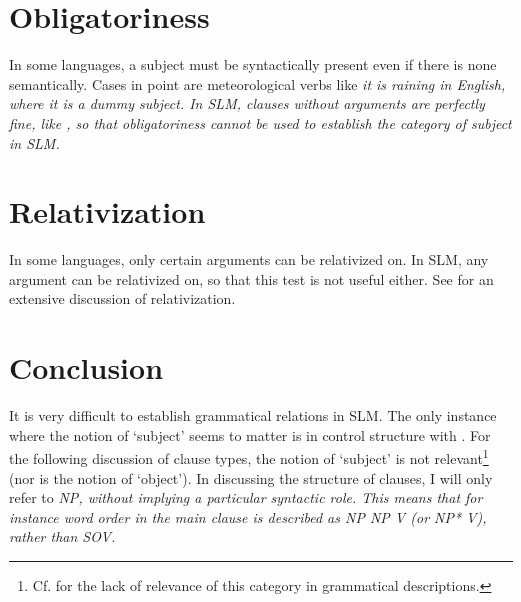 \section{Obligatoriness}\label{sec:grel:Obligatoriness}
In some languages, a subject must be syntactically present even if there is none semantically. Cases in point are meteorological verbs like \em it is raining \em in English, where \em it \em is a dummy subject. In SLM, clauses without arguments are perfectly fine, like , so that obligatoriness cannot be used to establish the category of subject in SLM.

\section{Relativization}\label{sec:grel:Relativization}
In some languages, only certain arguments can be relativized on. In SLM, any argument can be relativized on, so that this test is not useful either. See  for an extensive discussion of relativization.

\section{Conclusion}\label{sec:grel:Conclusion}
It is very difficult to establish grammatical relations in SLM. The only instance where the notion of `subject' seems to matter is in control structure with . For the following discussion of clause types, the notion of `subject' is not relevant\footnote{Cf. \citet[51f]{Schachter1996none} for  the lack of relevance of this category in grammatical descriptions.}
(nor is the notion of `object').
In discussing the structure of clauses, I will only refer to \em NP\em, without implying a particular syntactic role. This means that for instance word order in the main clause is described as \em NP NP V \em (or \em NP* V\em), rather than \em SOV\em.


 

% 

 